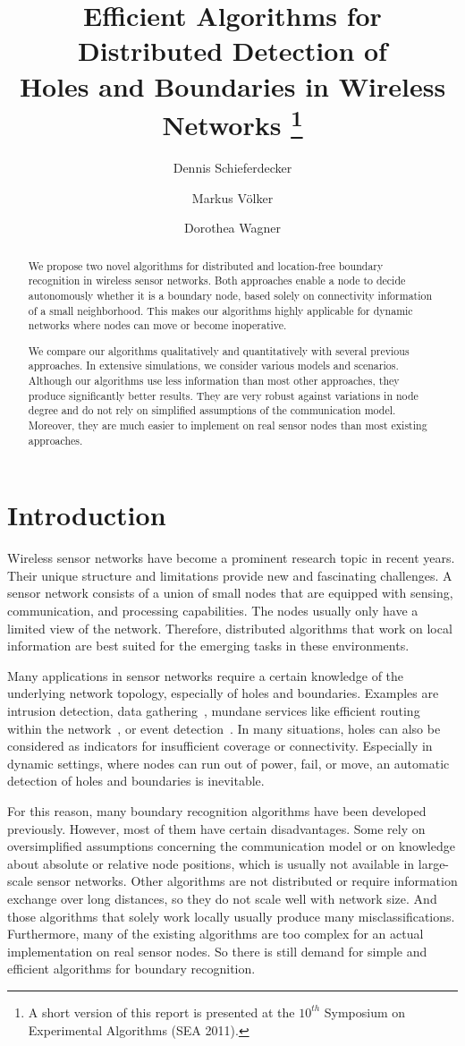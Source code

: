 \documentclass{llncs}
\title{Efficient Algorithms for Distributed Detection of \\ Holes and Boundaries in Wireless Networks
\thanks{A short version of this report is presented at the $10^{th}$ Symposium on Experimental Algorithms (SEA 2011).}
}
\author{Dennis Schieferdecker \and Markus V\"olker \and Dorothea Wagner}
\institute{Karlsruhe Institute of Technology (KIT), Germany \\ \email{\{schieferdecker,m.voelker,dorothea.wagner\}@kit.edu}}
\begin{document}
\maketitle
\begin{abstract}
We propose two novel algorithms for distributed and location-free boundary recognition in wireless sensor networks.
Both approaches enable a node to decide autonomously whether it is a boundary node, based solely on connectivity information of a small neighborhood.
This makes our algorithms highly applicable for dynamic networks where nodes can move or become inoperative.

We compare our algorithms qualitatively and quantitatively with several previous approaches.
In extensive simulations, we consider various models and scenarios.
Although our algorithms use less information than most other approaches, they produce significantly better results.
They are very robust against variations in node degree and do not rely on simplified assumptions of the communication model.
Moreover, they are much easier to implement on real sensor nodes than most existing approaches.
\end{abstract}




\section{Introduction}
Wireless sensor networks have become a prominent research topic in recent years.
Their unique structure and limitations provide new and fascinating challenges.
A sensor network consists of a union of small nodes that are equipped with sensing, communication, and processing capabilities.
The nodes usually only have a limited view of the network. 
Therefore, distributed algorithms that work on local information are best suited for the emerging tasks in these environments.

Many applications in sensor networks require a certain knowledge of the underlying network topology, especially of holes and boundaries.
Examples are intrusion detection, data gathering~\cite{wgm06}, mundane services like efficient routing within the network~\cite{fgg04,rao03}, or event detection~\cite{dll09}.
In many situations, holes can also be considered as indicators for insufficient coverage or connectivity.
Especially in dynamic settings, where nodes can run out of power, fail, or move, an automatic detection of holes and boundaries is inevitable.

For this reason, many boundary recognition algorithms have been developed previously.
However, most of them have certain disadvantages.
Some rely on oversimplified assumptions concerning the communication model or on knowledge about absolute or relative node positions, which is usually not available in large-scale sensor networks.
Other algorithms are not distributed or require information exchange over long distances, so they do not scale well with network size.
And those algorithms that solely work locally usually produce many misclassifications.
Furthermore, many of the existing algorithms are too complex for an actual implementation on real sensor nodes.
So there is still demand for simple and efficient algorithms for boundary recognition.
\end{document}
